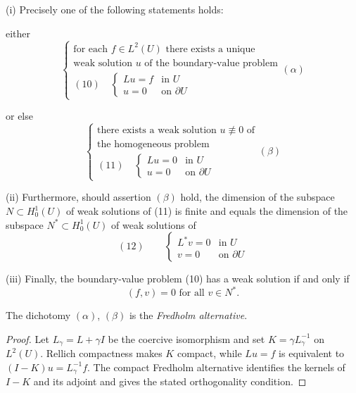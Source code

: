 \begin{theorem}
\label{thm:second-existence-fredholm-alternative}

(i) Precisely one of the following statements holds:

either
$$\begin{cases} \text{for each } f \in L^2(U) \text{ there exists a unique} \\ \text{weak solution } u \text{ of the boundary-value problem} \\ (10) \quad \begin{cases} Lu = f & \text{in } U \\ u = 0 & \text{on } \partial U \end{cases} \end{cases} (\alpha)$$

or else
$$\begin{cases} \text{there exists a weak solution } u \not\equiv 0 \text{ of} \\ \text{the homogeneous problem} \\ (11) \quad \begin{cases} Lu = 0 & \text{in } U \\ u = 0 & \text{on } \partial U \end{cases} \end{cases} (\beta)$$

(ii) Furthermore, should assertion $(\beta)$ hold, the dimension of the subspace $N \subset H_0^1(U)$ of weak solutions of (11) is finite and equals the dimension of the subspace $N^* \subset H_0^1(U)$ of weak solutions of
$$(12) \qquad \begin{cases} L^*v = 0 & \text{in } U \\ v = 0 & \text{on } \partial U \end{cases}$$

(iii) Finally, the boundary-value problem (10) has a weak solution if and only if
$$(f,v) = 0 \text{ for all } v \in N^*.$$

The dichotomy $(\alpha)$, $(\beta)$ is the \textit{Fredholm alternative}.
\end{theorem}

\begin{proof}
\sketch Let $L_\gamma=L+\gamma I$ be the coercive isomorphism and set $K=\gamma L_\gamma^{-1}$ on $L^2(U)$. Rellich compactness makes $K$ compact, while $Lu=f$ is equivalent to $(I-K)u=L_\gamma^{-1}f$. The compact Fredholm alternative identifies the kernels of $I-K$ and its adjoint and gives the stated orthogonality condition.
\end{proof}

